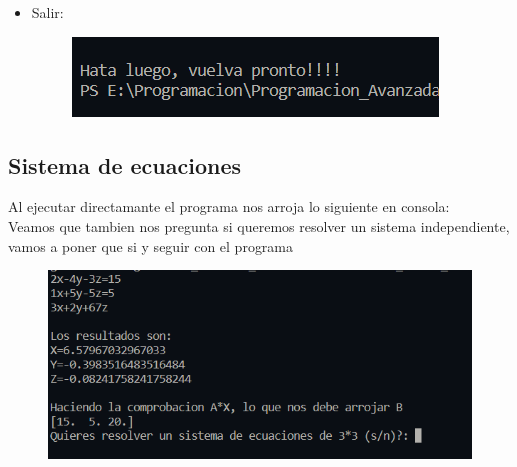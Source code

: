 \documentclass[12pt]{article}
\begin{document}
\begin{itemize}
	\item Salir:
	
	\begin{figure}[H]
		\begin{center}
 			\includegraphics[width = .6\textwidth]{1_7.png}
		\end{center} 
	\end{figure}
	
	\end{itemize}
	
\subsection{Sistema de ecuaciones}
Al ejecutar directamante el programa nos arroja lo siguiente en consola:\\
Veamos que tambien nos pregunta si queremos resolver un sistema independiente, vamos a poner que si  y seguir con el programa
	
	\begin{figure}[H]
		\begin{center}
 			\includegraphics[width = .6\textwidth]{1_8.png}
		\end{center} 
	\end{figure}
	
\end{document}

